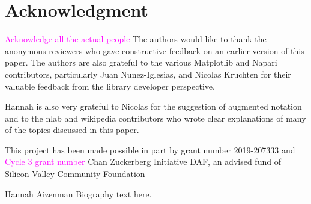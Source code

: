 \documentclass[journal]{IEEEtran}
\newcommand{\note}[1]{\textcolor{magenta}{#1}}
\theoremstyle{definition}
\theoremstyle{remark}
\begin{document}
\section*{Acknowledgment}
\note{Acknowledge all the actual people}
The authors would like to thank the anonymous reviewers who gave constructive feedback on an earlier version of this paper. The authors are also grateful to  the various Matplotlib and Napari contributors, particularly Juan Nunez-Iglesias, and Nicolas Kruchten for their valuable feedback from the library developer perspective.

Hannah is also very grateful to Nicolas for the suggestion of augmented notation and to the nlab and wikipedia contributors who wrote clear explanations of many of the topics discussed in this paper.

This project has been made possible in part by grant number 2019-207333 and \note{Cycle 3 grant number} Chan Zuckerberg Initiative DAF, an advised fund of Silicon Valley Community Foundation


\ifCLASSOPTIONcaptionsoff
  \newpage
\fi



\printbibliography



\begin{IEEEbiographynophoto}{Hannah Aizenman}
Biography text here.
\end{IEEEbiographynophoto}
\end{document}
